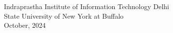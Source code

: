   \author{Yaman Kumar}
  \vspace{0.5cm}
  \vfill
  \begin{center}
    \Large{Indraprastha Institute of Information Technology Delhi} \\
    \Large{State University of New York at Buffalo} \\
    \vspace{0.5cm}
    \Large{October, 2024}
  \end{center}










\newpage
 



 

 
  
  


